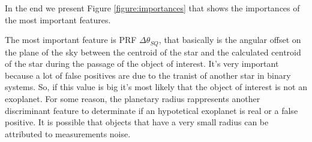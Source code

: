 \documentclass[11pt, a4paper]{article}
\begin{document}
  In the end we present Figure \ref{figure:importances} that shows the importances of the most important features.

  The most important feature is PRF $\Delta\theta_{SQ}$, that basically is the angular offset on the plane of the sky between the centroid of the star and the calculated centroid of the star during the passage of the object of interest.
  It's very important because a lot of false positives are due to the tranist of another star in binary systems.
  So, if this value is big it's most likely that the object of interest is not an exoplanet.
  For some reason, the planetary radius rappresents another discriminant feature to determinate if an hypotetical exoplanet is real or a false positive.
  It is possible that objects that have a very small radius can be attributed to measurements noise.

\clearpage
\appendix
\appendixpage
\end{document}
